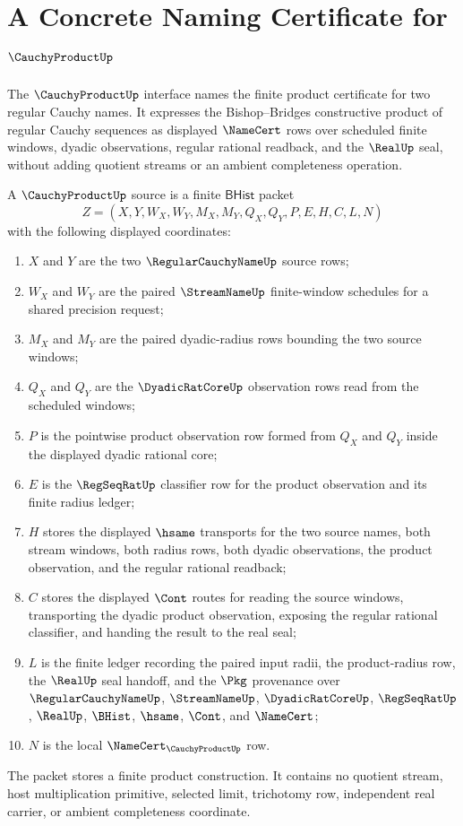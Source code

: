 \chapter{A Concrete Naming Certificate for $\CauchyProductUp$}
\label{ch:concrete-instances-cauchyproduct-namecert}

The $\CauchyProductUp$ interface names the finite product certificate for two regular Cauchy names. It expresses the Bishop--Bridges constructive product of regular Cauchy sequences as displayed $\NameCert$ rows over scheduled finite windows, dyadic observations, regular rational readback, and the $\RealUp$ seal, without adding quotient streams or an ambient completeness operation.

\begin{definition}
\label{def:cauchy-product-namecert-source}
A $\CauchyProductUp$ source is a finite $\mathsf{BHist}$ packet
$$
Z=(X,Y,W_X,W_Y,M_X,M_Y,Q_X,Q_Y,P,E,H,C,L,N)
$$
with the following displayed coordinates:
\begin{enumerate}
\item $X$ and $Y$ are the two $\RegularCauchyNameUp$ source rows;
\item $W_X$ and $W_Y$ are the paired $\StreamNameUp$ finite-window schedules for a shared precision request;
\item $M_X$ and $M_Y$ are the paired dyadic-radius rows bounding the two source windows;
\item $Q_X$ and $Q_Y$ are the $\DyadicRatCoreUp$ observation rows read from the scheduled windows;
\item $P$ is the pointwise product observation row formed from $Q_X$ and $Q_Y$ inside the displayed dyadic rational core;
\item $E$ is the $\RegSeqRatUp$ classifier row for the product observation and its finite radius ledger;
\item $H$ stores the displayed $\hsame$ transports for the two source names, both stream windows, both radius rows, both dyadic observations, the product observation, and the regular rational readback;
\item $C$ stores the displayed $\Cont$ routes for reading the source windows, transporting the dyadic product observation, exposing the regular rational classifier, and handing the result to the real seal;
\item $L$ is the finite ledger recording the paired input radii, the product-radius row, the $\RealUp$ seal handoff, and the $\Pkg$ provenance over $\RegularCauchyNameUp$, $\StreamNameUp$, $\DyadicRatCoreUp$, $\RegSeqRatUp$, $\RealUp$, $\BHist$, $\hsame$, $\Cont$, and $\NameCert$;
\item $N$ is the local $\NameCert_{\CauchyProductUp}$ row.
\end{enumerate}
The packet stores a finite product construction. It contains no quotient stream, host multiplication primitive, selected limit, trichotomy row, independent real carrier, or ambient completeness coordinate.
\end{definition}

